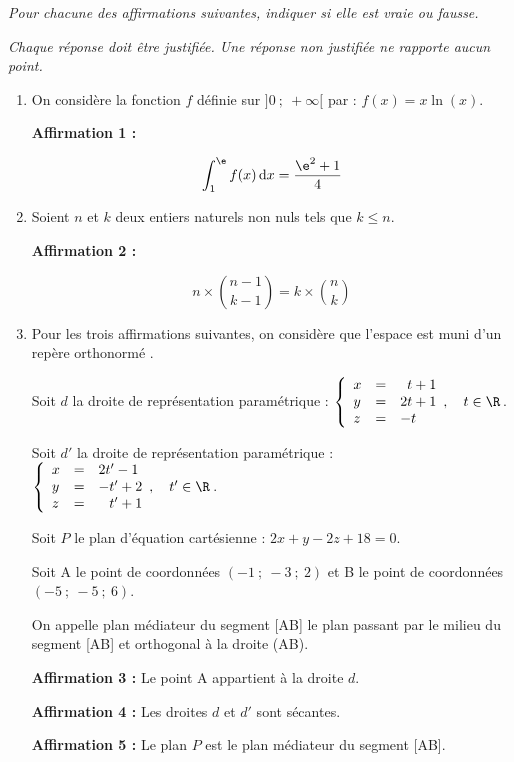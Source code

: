 \emph{Pour chacune des affirmations suivantes, indiquer si elle est vraie ou fausse.}

	\medskip

	\emph{Chaque réponse doit être justifiée. Une réponse non justifiée ne rapporte aucun point.}

	\bigskip

	\begin{enumerate}[itemsep=8mm]
		\item On considère la fonction $f$ définie sur $]0 ~;~ +\infty [$ par : $f(x)=x \ln(x)$.

		\textbf{Affirmation 1 :}

\[\int_{1}^{\e} f(x) \,\mathrm{d} x=\dfrac{\e^{2}+1}{4}\]

\item Soient $n$ et $k$ deux entiers naturels non nuls tels que $k \leqslant n$.

\textbf{Affirmation 2 :}

\[n \times\binom{ n-1}{k-1}=k \times\binom{ n}{k}\]

		\item Pour les trois affirmations suivantes, on considère que l'espace est muni d'un repère orthonormé \Oijk.

\medskip

Soit $d$ la droite de représentation paramétrique : \quad $\left\{\begin{array}{l c l}
x&=&\phantom{2}t+1 \\
y&=&2 t+1 \\
z&=&-t
\end{array},\quad t \in \R\right.$.

		Soit $d'$ la droite de représentation paramétrique : \quad $\left\{\begin{array}{l c l}
x&=&2t'-1 \\
y&=&-t'+2 \\
z&=&\phantom{-}t'+1
\end{array},\quad t' \in \R\right.$.

\medskip

Soit $P$ le plan d'équation cartésienne : $2 x+y-2 z+18=0$.

Soit A le point de coordonnées $(-1 ~;~-3 ~;~ 2)$ et B le point de coordonnées $(-5 ~;~-5~;~6)$.

On appelle plan médiateur du segment [AB] le plan passant par le milieu du segment [AB] et orthogonal à la droite (AB).

\medskip

\textbf{Affirmation 3 :} Le point A appartient à la droite $d$.

\medskip

\textbf{Affirmation 4 :} Les droites $d$ et $d'$ sont sécantes.

\medskip

		\textbf{Affirmation 5 :} Le plan $P$ est le plan médiateur du segment [AB].
	\end{enumerate}

